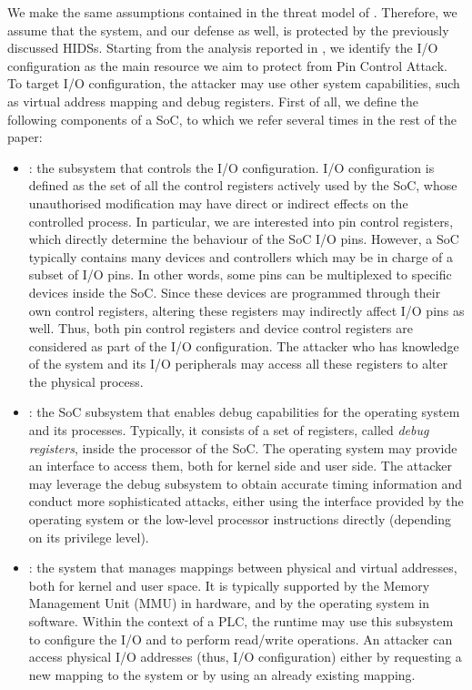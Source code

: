 We make the same assumptions contained in the threat model of .
Therefore, we assume that the system, and our defense as well, is protected by the previously discussed HIDSs.
Starting from the analysis reported in , we identify the I/O configuration as the main resource we aim to protect from Pin Control Attack.
To target I/O configuration, the attacker may use other system capabilities, such as virtual address mapping and debug registers.
First of all, we define the following components of a SoC, to which we refer several times in the rest of the paper:
\begin{itemize}
	\item {}: the subsystem that controls the I/O configuration. I/O configuration is defined as the set of all the control registers
		actively used by the SoC, whose unauthorised modification may have direct or indirect effects on the controlled process.
		In particular, we are interested into pin control registers, which directly determine the behaviour of the SoC I/O pins.
		However, a SoC typically contains many devices and controllers which may be in charge of a subset of I/O pins. In other words, some pins
		can be multiplexed to specific devices inside the SoC. Since these devices are programmed through their own control registers,
		altering these registers may indirectly affect I/O pins as well. Thus, both pin control registers and device control registers
		are considered as part of the I/O configuration. The attacker who has knowledge of the system and its I/O peripherals may access
		all these registers to alter the physical process.
	\item {}: the SoC subsystem that enables debug capabilities for the operating system and its processes.
		Typically, it consists of a set of registers, called \emph{debug registers}, inside the processor of the SoC.
		The operating system may provide an interface to access them, both for kernel side and user side.
		The attacker may leverage the debug subsystem to obtain accurate timing information and conduct more sophisticated attacks,
		either using the interface provided by the operating system or the low-level processor instructions directly (depending on its privilege level).
	\item {}: the system that manages mappings between physical and virtual addresses, both for kernel and user space.
		It is typically supported by the Memory Management Unit (MMU) in hardware, and by the operating system in software. Within the context of a PLC,
		the runtime may use this subsystem to configure the I/O and to perform read/write operations. An attacker can access physical I/O addresses
		(thus, I/O configuration) either by requesting a new mapping to the system or by using an already existing mapping.
\end{itemize}

